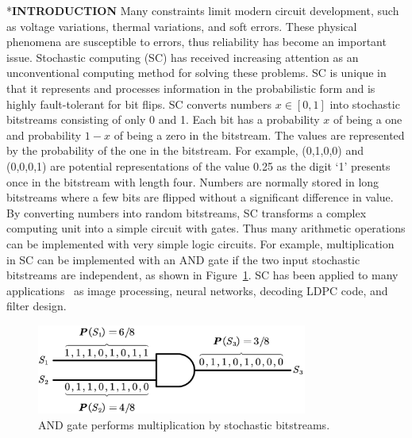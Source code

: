 \documentclass[conference,letterpaper]{IEEEtran}
\makeatletter
\renewcommand{\section}{\@startsection{section}{1}{0mm}
    {-\baselineskip}{0.001\baselineskip}{\bf\leftline}}
\makeatother
\begin{document}
\section*{\textbf{\large INTRODUCTION}}
Many constraints limit modern circuit development, such as voltage variations, thermal variations, and soft errors. These physical phenomena are susceptible to errors, thus reliability has become an important issue. Stochastic computing (SC) has received increasing attention as an unconventional computing method for solving these problems. SC is unique in that it represents and processes information in the probabilistic form and is highly fault-tolerant for bit flips. SC converts numbers $x\in[0,1]$ into stochastic bitstreams consisting of only 0 and 1. 
Each bit has a probability $x$ of being a one and probability $1-x$ of being a zero in the bitstream. The values are represented by the probability of the one in the bitstream. For example, (0,1,0,0) and (0,0,0,1) are potential representations of the value 0.25 as the digit `1' presents once in the bitstream with length four. Numbers are normally stored in long bitstreams where a few bits are flipped without a significant difference in value. By converting numbers into random bitstreams, SC %
transforms a complex computing unit into a simple circuit with gates. Thus many arithmetic operations can be implemented with very simple logic circuits. For example, multiplication in SC %
 can be implemented with an AND gate if the two input stochastic bitstreams are independent, as shown in Figure~\ref{fig:sto}. 
SC has been applied to many applications~\cite{Promise-and-Challenge} as image processing, neural networks, decoding LDPC code, and filter design.
\vspace{3ex}


\begin{figure}[t]
	\centering
	\includegraphics[width=3.5in]{fig/AND3.pdf}
	\caption{\label{fig:sto}AND gate performs multiplication by stochastic bitstreams.}  \vspace{-3.5ex}
\end{figure}
\end{document}
